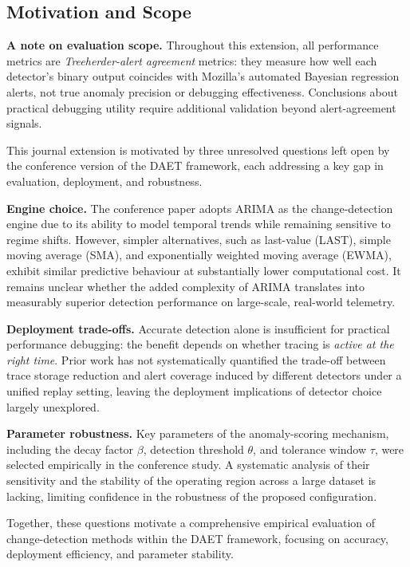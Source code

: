 \documentclass[a4paper,fleqn]{cas-sc}
\theoremstyle{plain}
\begin{document}
\subsection{Motivation and Scope}\label{sec:intro:extension}

\textbf{A note on evaluation scope.}
Throughout this extension, all performance metrics are
\emph{Treeherder-alert agreement} metrics: they measure how well each
detector's binary output coincides with Mozilla's automated Bayesian
regression alerts, not true anomaly precision or debugging
effectiveness.
Conclusions about practical debugging utility require additional
validation beyond alert-agreement signals.

This journal extension is motivated by three unresolved questions left open
by the conference version of the DAET framework, each addressing a key gap
in evaluation, deployment, and robustness.

\textbf{Engine choice.}
The conference paper adopts ARIMA as the change-detection engine due to its
ability to model temporal trends while remaining sensitive to regime shifts.
However, simpler alternatives, such as last-value (LAST), simple moving average
(SMA), and exponentially weighted moving average (EWMA), exhibit similar
predictive behaviour at substantially lower computational cost.
It remains unclear whether the added complexity of ARIMA translates into
measurably superior detection performance on large-scale, real-world telemetry.

\textbf{Deployment trade-offs.}
Accurate detection alone is insufficient for practical performance debugging:
the benefit depends on whether tracing is \emph{active at the right time}.
Prior work has not systematically quantified the trade-off between trace
storage reduction and alert coverage induced by different detectors under a
unified replay setting, leaving the deployment implications of detector choice
largely unexplored.

\textbf{Parameter robustness.}
Key parameters of the anomaly-scoring mechanism, including the decay factor
$\beta$, detection threshold $\theta$, and tolerance window $\tau$, were
selected empirically in the conference study.
A systematic analysis of their sensitivity and the stability of the operating
region across a large dataset is lacking, limiting confidence in the robustness
of the proposed configuration.

Together, these questions motivate a comprehensive empirical evaluation of
change-detection methods within the DAET framework, focusing on accuracy,
deployment efficiency, and parameter stability.
\end{document}
